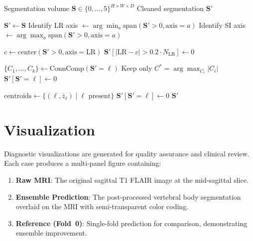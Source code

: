 \documentclass[12pt, a4paper]{article}
\begin{document}
\begin{algorithm}[H]
\caption{Anatomical Post-Processing}
\label{alg:postprocess}
\begin{algorithmic}[1]
\Require Segmentation volume $\mathbf{S} \in \{0,\ldots,5\}^{H \times W \times D}$
\Ensure Cleaned segmentation $\mathbf{S}'$

\State $\mathbf{S}' \gets \mathbf{S}$
\State Identify LR axis $\gets \arg\min_a \text{span}(\mathbf{S}' > 0, \text{axis}=a)$
\State Identify SI axis $\gets \arg\max_a \text{span}(\mathbf{S}' > 0, \text{axis}=a)$

\State $c \gets \text{center}(\mathbf{S}' > 0, \text{axis}=\text{LR})$
\State $\mathbf{S}'[|\text{LR} - c| > 0.2 \cdot N_{\text{LR}}] \gets 0$

    \State $\{C_1, \ldots, C_k\} \gets \text{ConnComp}(\mathbf{S}' = \ell)$
    \State Keep only $C^* = \arg\max_{C_i} |C_i|$
     $\mathbf{S}'[\mathbf{S}'=\ell] \gets 0$ \EndIf
\EndFor

\State $\text{centroids} \gets \{(\ell, \bar{z}_\ell) \mid \ell \text{ present}\}$ 
    \State $\mathbf{S}'[\mathbf{S}'=\ell] \gets 0$
\EndFor
\State \Return $\mathbf{S}'$
\end{algorithmic}
\end{algorithm}

\section{Visualization}

Diagnostic visualizations are generated for quality assurance and clinical review. Each case produces a multi-panel figure containing:

\begin{enumerate}[noitemsep]
    \item \textbf{Raw MRI}: The original sagittal T1 FLAIR image at the mid-sagittal slice.
    \item \textbf{Ensemble Prediction}: The post-processed vertebral body segmentation overlaid on the MRI with semi-transparent color coding.
    \item \textbf{Reference (Fold~0)}: Single-fold prediction for comparison, demonstrating ensemble improvement.
\end{enumerate}
\end{document}
